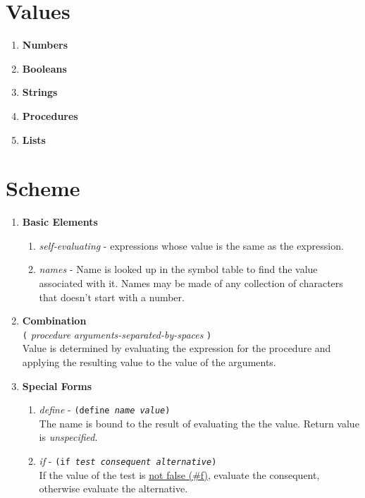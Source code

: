 \newpage

\section*{Values}
\begin{enumerate}
\item {\bf Numbers}
\vspace{.5in}
\item {\bf Booleans}
\vspace{.5in}
\item {\bf Strings}
\vspace{.5in}
\item {\bf Procedures}
\vspace{.5in}
\item {\bf Lists}
\vspace{.5in}
\end{enumerate}

\section*{Scheme}
\begin{enumerate}
\item {\bf Basic Elements}
  \begin{enumerate}
  \item {\it self-evaluating} - expressions whose value is the same as
    the expression.
    \vspace{1in}
  \item {\it names} - Name is looked up in the symbol table to find
    the value associated with it.  Names may be made of any collection
    of characters that doesn't start with a number.
    \vspace{1in}
  \end{enumerate}
\item {\bf Combination}\\
  {\tt (} {\it procedure} {\it arguments-separated-by-spaces} {\tt )}\\
  Value is determined by evaluating the expression for the procedure
  and applying the resulting value to the value of the arguments.
  \vspace{1in}

\item {\bf Special Forms}
  \begin{enumerate}
  \item {\large {\it define}} - {\tt (define {\it name value})}\\ The
    name is bound to the result of evaluating the the value.  Return
    value is {\it unspecified}.
    \vspace{1in}
  \item {\large {\it if}} - {\tt (if {\it test consequent alternative})}\\ If
    the value of the test is \underline{not false (\#f)}, evaluate the
    consequent, otherwise evaluate the alternative.
    \vspace{1in}
  \end{enumerate}
\end{enumerate}

